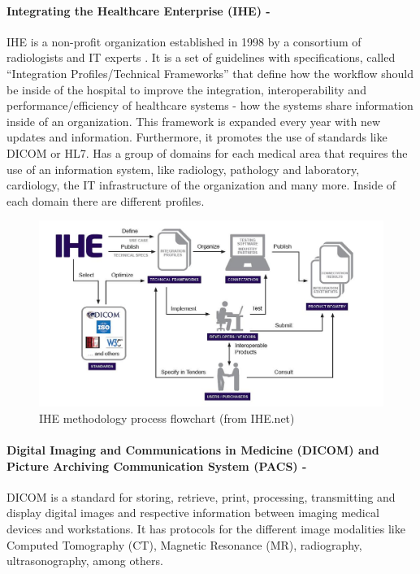 \documentclass[mim_thesis.tex]{subfiles}
\begin{document}
\paragraph{\textbf{Integrating the Healthcare Enterprise (IHE) -}}
IHE is a non-profit organization established in 1998 by a consortium of radiologists and IT experts \citep{IHE2018}. It is a set of guidelines with specifications, called “Integration Profiles/Technical Frameworks” that define how the workflow should be inside of the hospital to improve the integration, interoperability and performance/efficiency of healthcare systems - how the systems share information inside of an organization. This framework is expanded every year with new updates and information. Furthermore, it promotes the use of standards like DICOM or HL7. Has a group of domains for each medical area that requires the use of an information system, like radiology, pathology and laboratory, cardiology, the IT infrastructure of the organization and many more. Inside of each domain there are different profiles. 

\begin{figure}[H]
	\centering
    \includegraphics[width=1\textwidth]{img/IHE_process_flowchart.jpg}
	\caption{IHE methodology process flowchart (from IHE.net)}
	\label{fig:IHE_process_flowchart}
\end{figure}


\paragraph{\textbf{Digital Imaging and Communications in Medicine (DICOM) and Picture Archiving Communication System (PACS) -}}
DICOM is a standard for storing, retrieve, print, processing, transmitting and display digital images and respective information between imaging medical devices and workstations. It has protocols for the different image modalities like Computed Tomography (CT), Magnetic Resonance (MR), radiography, ultrasonography, among others.\\
\end{document}
